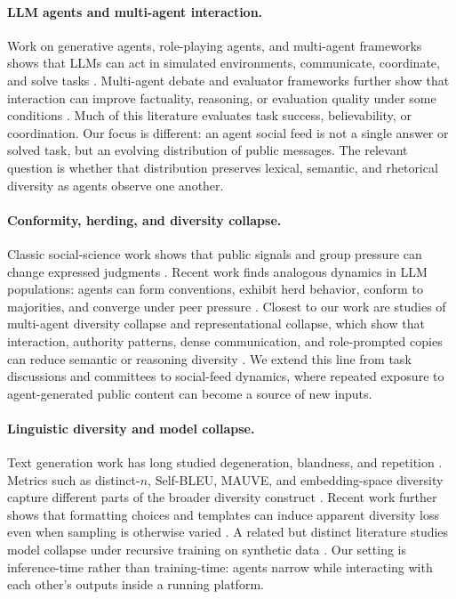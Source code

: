 \documentclass[11pt]{article}
\begin{document}
\paragraph{LLM agents and multi-agent interaction.}
Work on generative agents, role-playing agents, and multi-agent frameworks shows that LLMs can act in simulated environments, communicate, coordinate, and solve tasks \citep{park2023generative,li2023camel,chen2023agentverse,wu2023autogen,hong2023metagpt,qian2024chatdev,zhou2024sotopia}. Multi-agent debate and evaluator frameworks further show that interaction can improve factuality, reasoning, or evaluation quality under some conditions \citep{du2023debate,chen2024reconcile,chan2024chateval}. Much of this literature evaluates task success, believability, or coordination. Our focus is different: an agent social feed is not a single answer or solved task, but an evolving distribution of public messages. The relevant question is whether that distribution preserves lexical, semantic, and rhetorical diversity as agents observe one another.

\paragraph{Conformity, herding, and diversity collapse.}
Classic social-science work shows that public signals and group pressure can change expressed judgments \citep{asch1951,bikhchandani1992,muchnik2013social}. Recent work finds analogous dynamics in LLM populations: agents can form conventions, exhibit herd behavior, conform to majorities, and converge under peer pressure \citep{ashery2025conventions,cho2025herd,choi2025conformity}. Closest to our work are studies of multi-agent diversity collapse and representational collapse, which show that interaction, authority patterns, dense communication, and role-prompted copies can reduce semantic or reasoning diversity \citep{chen2026diversitycollapse,patel2026representational}. We extend this line from task discussions and committees to social-feed dynamics, where repeated exposure to agent-generated public content can become a source of new inputs.

\paragraph{Linguistic diversity and model collapse.}
Text generation work has long studied degeneration, blandness, and repetition \citep{holtzman2020curious}. Metrics such as distinct-$n$, Self-BLEU, MAUVE, and embedding-space diversity capture different parts of the broader diversity construct \citep{li2016diversity,zhu2018selfbleu,pillutla2021mauve,tevet2021evaluating}. Recent work further shows that formatting choices and templates can induce apparent diversity loss even when sampling is otherwise varied \citep{yun2025format}. A related but distinct literature studies model collapse under recursive training on synthetic data \citep{shumailov2024modelcollapse}. Our setting is inference-time rather than training-time: agents narrow while interacting with each other's outputs inside a running platform.
\end{document}
